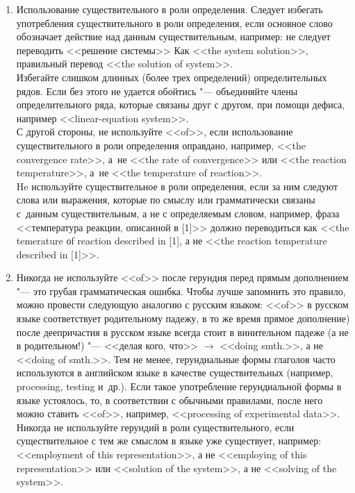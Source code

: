 \documentclass[a5paper, 10pt, twoside, numbers=enddot]{scrartcl}
\newcommand{\etal}{и~др.\xspace}
\begin{document}
\begin{enumerate}
  \item Использование существительного в роли определения. Следует избегать употребления
    существительного в роли определения, если основное слово  обозначает действие над данным
    существительным, например: не следует  переводить <<решение системы>> Как <<the system
    solution>>, правильный перевод <<the solution of system>>.\\ [4pt]
    Избегайте слишком длинных (более трех определений) определительных рядов. Если без этого не
    удается обойтись "--- объединяйте члены определительного ряда, которые связаны друг с другом,
    при помощи дефиса, например <<linear-equation system>>.\\ [4pt]
    С другой стороны, не используйте <<of>>, если использование существительного в роли определения
    оправдано, например, <<the convergence rate>>, а~не <<the rate of convergence>> или <<the
    reaction temperature>>, а~не <<the tem\-perature of reaction>>.\\ [4pt]
    He используйте существительное в роли определения, если за ним следуют слова или выражения,
    которые по смыслу или грамматически связаны с~данным существительным, а не с определяемым
    словом, например, фраза <<температура реакции, описанной в [1]>> должно переводиться как <<the
    temerature оf reaction described in [1], а не <<the reaction temperature described in [1]>>.

  \item Никогда не используйте <<of>> после герундия перед прямым дополнением "--- это грубая
    грамматическая ошибка. Чтобы лучше запомнить это правило, можно провести следующую аналогию с
    русским языком: <<of>> в русском языке соответствует родительному падежу, в то же время прямое
    дополнение) после деепричастия в русском языке всегда стоит в винительном падеже (а не в
    родительном!) "--- <<делая кого, что>> $\rightarrow$ <<doing smth.>>, а не <<doing of smth.>>.
    Тем не менее, герундиальные формы глаголов часто используются в английском языке в качестве
    существительных (например, processing, testing \etal). Если такое употребление герундиальной
    формы в языке устоялось, то, в  соответствии с обычными правилами, после него можно ставить
    <<of>>, например, <<processing of experimental data>>.\\ [4pt]
    Никогда не используйте герундий в роли существительного, если существительное с тем же смыслом в
    языке уже существует, например: <<employment of this representation>>, а не <<employing of this
    representation>> или <<solution of the system>>, а не <<solving of the system>>.


\end{enumerate}
\end{document}
